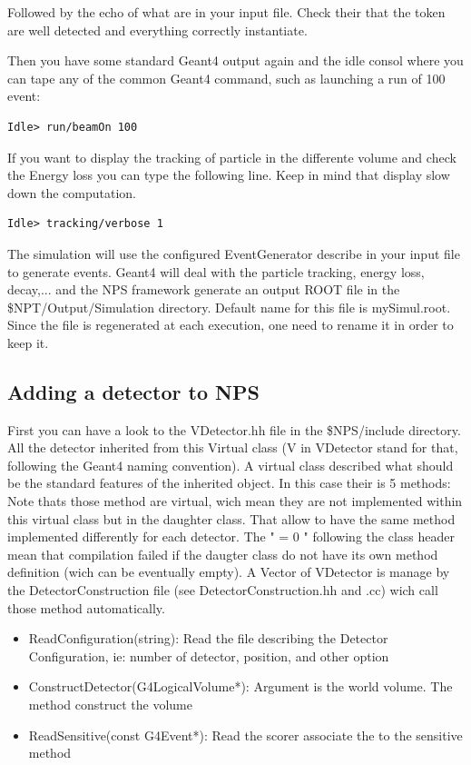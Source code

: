 \documentclass{book}
\begin{document}
Followed by the echo of what are in your input file. Check their that the token are well detected and everything correctly instantiate.

Then you have some standard Geant4 output again and the idle consol where you can tape any of the common Geant4 command, such as launching a run of 100 event:
\begin{verbatim}
Idle> run/beamOn 100
\end{verbatim}

If you want to display the tracking of particle in the differente volume and check the Energy loss you can type the following line. Keep in mind that display slow down the computation.

\begin{verbatim}
Idle> tracking/verbose 1
\end{verbatim}

The simulation will use the configured EventGenerator describe in your input file to generate events. Geant4 will deal with the particle tracking, energy loss, decay,... and the NPS framework generate an output ROOT file in the \$NPT/Output/Simulation directory. Default name for this file is mySimul.root. Since the file is regenerated at each execution, one need to rename it in order to keep it.

\subsection{ Adding a detector to NPS }

First you can have a look to the VDetector.hh file in the \$NPS/include directory. All the detector inherited from this Virtual class (V in VDetector stand for that, following the Geant4 naming convention). A virtual class described what should be the standard features of the inherited object. In this case their is 5 methods: Note thats those method are virtual, wich mean they are not implemented within this virtual class but in the daughter class. That allow to have the same method implemented differently for each detector. The " = 0 " following the class header mean that compilation failed if the daugter class do not have its own method definition (wich can be eventually empty). A Vector of VDetector is manage by the DetectorConstruction file (see DetectorConstruction.hh and .cc) wich call those method automatically.

	\begin{itemize}
		\item[] ReadConfiguration(string): Read the file describing the Detector Configuration, ie: number of detector, position, and other option
		\item[] ConstructDetector(G4LogicalVolume*): Argument is the world volume. The method construct the volume
		\item[] ReadSensitive(const G4Event*): Read the scorer associate the to the sensitive method
	\end{itemize}
	
\end{document}
